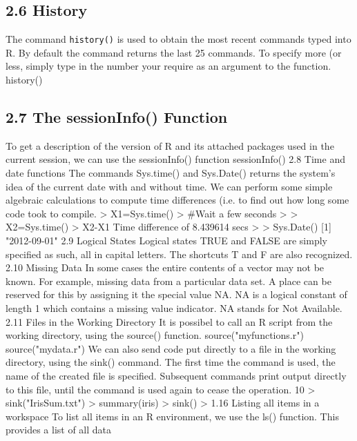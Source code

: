 \subsection*{2.6 History}
The command \texttt{history()} is used to obtain the most recent commands typed into R. 
By default the command returns the last 25 commands. To specify more (or less, simply type in the number your require as an argument to the function.
history()
\subsection{2.7 The sessionInfo() Function}
To get a description of the version of R and its attached packages used in the current session,
we can use the sessionInfo() function
sessionInfo()
2.8 Time and date functions
The commands Sys.time() and Sys.Date() returns the system's idea of the current date
with and without time. We can perform some simple algebraic calculations to compute time
differences (i.e. to find out how long some code took to compile.
> X1=Sys.time()
> #Wait a few seconds
>
> X2=Sys.time()
> X2-X1 Time difference of 8.439614 secs
>
> Sys.Date() [1] "2012-09-01"
2.9 Logical States
Logical states TRUE and FALSE are simply specified as such, all in capital letters. The
shortcuts T and F are also recognized.
2.10 Missing Data
In some cases the entire contents of a vector may not be known. For example, missing data
from a particular data set. A place can be reserved for this by assigning it the special value
NA.
NA is a logical constant of length 1 which contains a missing value indicator. NA stands
for Not Available.
2.11 Files in the Working Directory
It is possibel to call an R script from the working directory, using the source() function.
source("myfunctions.r")
source("mydata.r")
We can also send code put directly to a file in the working directory, using the sink()
command. The first time the command is used, the name of the created file is specified.
Subsequent commands print output directly to this file, until the command is used again to
cease the operation.
10
> sink("IrisSum.txt")
> summary(iris)
> sink()
>
1.16 Listing all items in a workspace
To list all items in an R environment, we use the ls() function. This provides a list of all data
